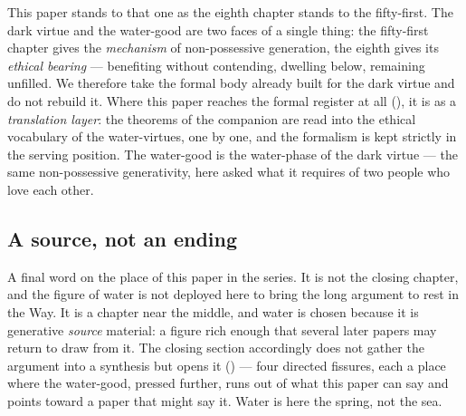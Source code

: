 This paper stands to that one as the eighth chapter stands to the fifty-first. The dark virtue and the water-good are two faces of a single thing: the fifty-first chapter gives the \emph{mechanism} of non-possessive generation, the eighth gives its \emph{ethical bearing} --- benefiting without contending, dwelling below, remaining unfilled. We therefore take the formal body already built for the dark virtue and do not rebuild it. Where this paper reaches the formal register at all (), it is as a \emph{translation layer}: the theorems of the companion are read into the ethical vocabulary of the water-virtues, one by one, and the formalism is kept strictly in the serving position. The water-good is the water-phase of the dark virtue --- the same non-possessive generativity, here asked what it requires of two people who love each other.

\subsection{A source, not an ending}
\label{p20:sub:intro-position}

A final word on the place of this paper in the series. It is not the closing chapter, and the figure of water is not deployed here to bring the long argument to rest in the Way. It is a chapter near the middle, and water is chosen because it is generative \emph{source} material: a figure rich enough that several later papers may return to draw from it. The closing section accordingly does not gather the argument into a synthesis but opens it () --- four directed fissures, each a place where the water-good, pressed further, runs out of what this paper can say and points toward a paper that might say it. Water is here the spring, not the sea.
